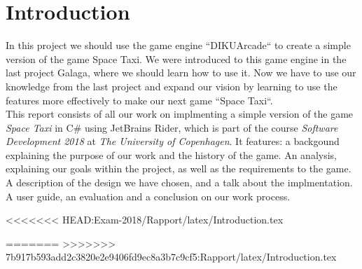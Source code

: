 \documentclass[../master.tex]{subfiles}
\begin{document}
\section{Introduction}
In this project we should use the game engine ``DIKUArcade`` to create a simple version of the game Space Taxi. We were introduced to this game engine in the last project Galaga, where we should learn how to use it. Now we have to use our knowledge from the last project and expand our vision by learning to use the features more effectively to make our next game ``Space Taxi``.\\

This report consists of all our work on implmenting a simple version of the game \textit{Space Taxi} in C\# using JetBrains Rider, which is part of the course \textit{Software Development 2018} at \textit{The University of Copenhagen}. It features: a backgound explaining the purpose of our work and the history of the game. An analysis, explaining our goals within the project, as well as the requirements to the game. A description of the design we have chosen, and a talk about the implmentation. A user guide, an evaluation and a conclusion on our work process.

<<<<<<< HEAD:Exam-2018/Rapport/latex/Introduction.tex

=======
>>>>>>> 7b917b593add2c3820e2e9406fd9ec8a3b7c9cf5:Rapport/latex/Introduction.tex
\end{document}
